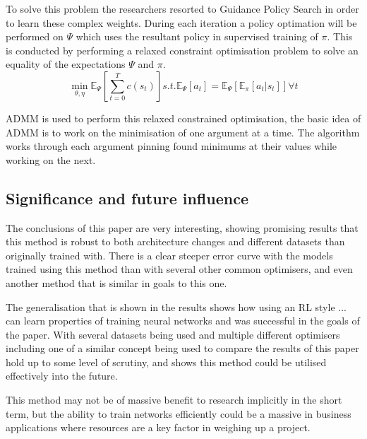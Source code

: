 \documentclass[sigconf]{acmart}
\begin{document}
  To solve this problem the researchers resorted to Guidance Policy Search in order to learn these complex weights. During each iteration a policy optimation will be performed on $\Psi$ which uses the resultant policy in supervised training of $\pi$.
  This is conducted by performing a relaxed constraint optimisation problem to solve an equality of the expectations $\Psi$ and $\pi$.
  \begin{equation}
    \min_{\theta, \eta}\mathbb{E}_{\Psi}[\sum^{T}_{t=0}c(s_t)] s.t. \mathbb{E}_{\Psi}[a_t]=\mathbb{E}_{\Psi}[\mathbb{E}_{\pi}[a_t|s_t]]\forall t
  \end{equation}
  
  ADMM is used to perform this relaxed constrained optimisation, the basic idea of ADMM is to work on the minimisation of one argument at a time. 
  The algorithm works through each argument pinning found minimums at their values while working on the next.
\subsection{Significance and future influence}
The conclusions of this paper are very interesting, showing promising results that this method is robust to both architecture changes and different datasets than originally trained with.
There is a clear steeper error curve with the models trained using this method than with several other common optimisers, and even another method that is similar in goals to this one. 

The generalisation that is shown in the results shows how using an RL style ... can learn properties of training neural networks and was successful in the goals of the paper.
With several datasets being used and multiple different optimisers including one of a similar concept being used to compare the results of this paper hold up to some level of scrutiny, and shows this 
method could be utilised effectively into the future. 

This method may not be of massive benefit to research implicitly in the short term, but the ability to train networks efficiently could be a massive in business applications where resources are a key factor in weighing up a project.



\end{document}
